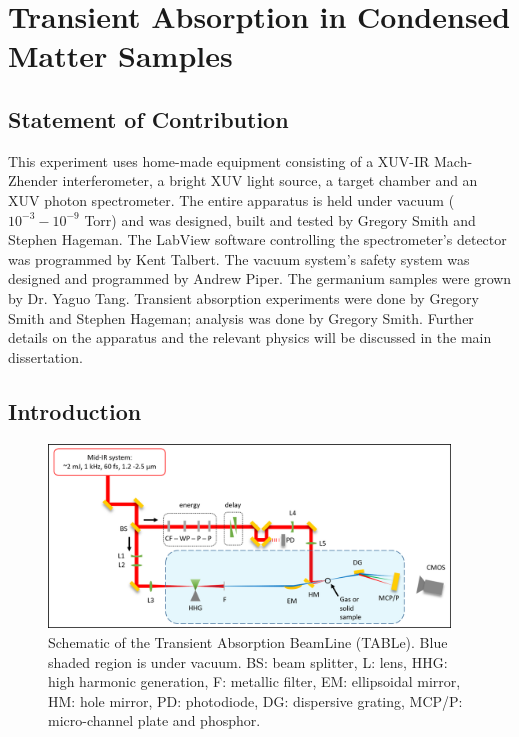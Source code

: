 \chapter{Transient Absorption in Condensed Matter Samples}

\section{Statement of Contribution}
This experiment uses home-made equipment consisting of a XUV-IR Mach-Zhender interferometer, a bright XUV light source, a target chamber and an XUV photon spectrometer. The entire apparatus is held under vacuum ($10^{-3} - 10^{-9}$ Torr) and was designed, built and tested by Gregory Smith and Stephen Hageman. The LabView software controlling the spectrometer's detector was programmed by Kent Talbert. The vacuum system's safety system was designed and programmed by Andrew Piper. The germanium samples were grown by Dr. Yaguo Tang. Transient absorption experiments were done by Gregory Smith and Stephen Hageman; analysis was done by Gregory Smith. Further details on the apparatus and the relevant physics will be discussed in the main dissertation.

\section{Introduction}

\begin{figure}
	\centering
	\includegraphics[width=0.95\textwidth]{figures/chap3/beamline_schematic.png}
	\caption{Schematic of the Transient Absorption BeamLine (TABLe). Blue shaded region is under vacuum. BS: beam splitter, L: lens, HHG: high harmonic generation, F: metallic filter, EM: ellipsoidal mirror, HM: hole mirror, PD: photodiode, DG: dispersive grating, MCP/P: micro-channel plate and phosphor.}
	\label{fig:beamline_schematic}
\end{figure}

